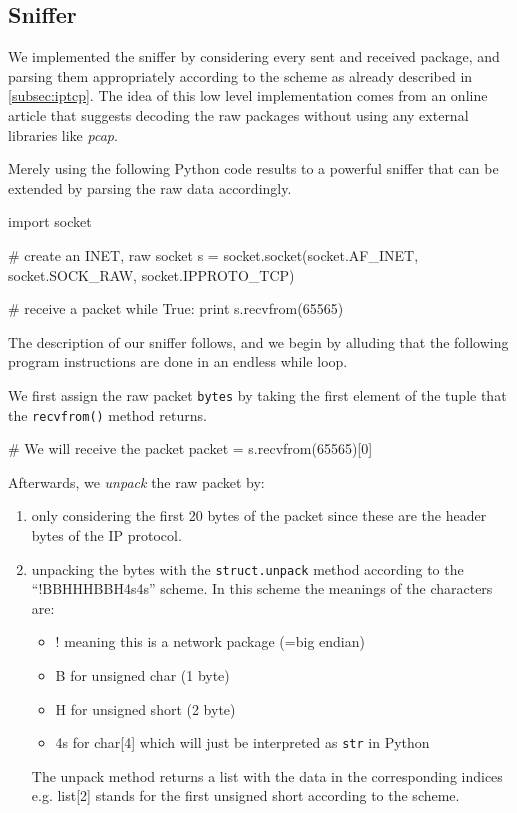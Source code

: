 \documentclass[11pt, a4paper]{article}
\begin{document}
\subsection{Sniffer}

We implemented the sniffer by considering every sent and received
package, and parsing them appropriately according to the scheme as
already described in \ref{subsec:iptcp}. The idea of this low level
implementation comes from an online article \cite{sniffer_py} that
suggests decoding the raw packages without using any external
libraries like \textit{pcap}.

Merely using the following Python code results to a powerful sniffer
that can be extended by parsing the raw data accordingly. 

\begin{python}
import socket
 
# create an INET, raw socket
s = socket.socket(socket.AF_INET, socket.SOCK_RAW, socket.IPPROTO_TCP)

# receive a packet
while True:
  print s.recvfrom(65565)
\end{python}

The description of our sniffer follows, and we begin by alluding that
the following program instructions are done in an endless while loop.

We first assign the raw packet \lstinline|bytes| by taking the first
element of the tuple that the \lstinline|recvfrom()| method returns. 

\begin{python}
# We will receive the packet 
packet = s.recvfrom(65565)[0]
\end{python}

Afterwards, we \textit{unpack} the raw packet by:

\begin{enumerate}
  \item only considering the first 20 bytes of the packet since these
    are the header bytes of the IP protocol. 
  \item unpacking the bytes with the \lstinline|struct.unpack|
    method according to the ``!BBHHHBBH4s4s'' scheme. In this scheme
    the meanings of the characters are:
    
    \begin{itemize}
      \item ! meaning this is a network package (=big endian)
      \item B for unsigned char (1 byte)
      \item H for unsigned short (2 byte)
      \item 4s for char[4] which will just be interpreted as
        \lstinline|str| in Python
    \end{itemize}
    The unpack method returns a list with the data in the
    corresponding indices e.g. list[2] stands for the first unsigned
    short according to the scheme. 
\end{enumerate}
\end{document}
